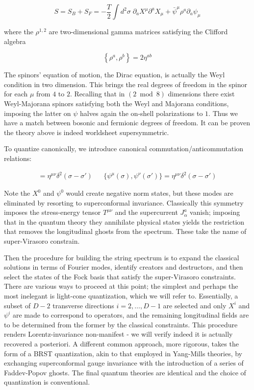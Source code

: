 \begin{equation}
S = S_B + S_F = -\frac{T}{2} \int d^2\sigma \; \partial_a X^\mu \partial^a X_\mu + \bar \psi^\mu \rho^a \partial_a \psi_\mu
\end{equation}

where the $\rho^{1,2}$ are two-dimensional gamma matrices satisfying the Clifford algebra

\begin{equation}
	\left\{ \rho^a,\rho^b \right\} = 2\eta^{ab}
	\label{}
\end{equation}

The spinors' equation of motion, the Dirac equation, is actually the Weyl condition in two dimension. This brings the real degrees of freedom in the spinor for each $\mu$ from $4$ to $2$. Recalling that in $(2\bmod 8)$ dimensions there exist Weyl-Majorana spinors satisfying both the Weyl and Majorana conditions, imposing the latter on $\psi$ halves again the on-shell polarizations to $1$. Thus we have a match between bosonic and fermionic degrees of freedom. It can be proven the theory above is indeed worldsheet supersymmetric.

To quantize canonically, we introduce canonical commutation/anticommutation relations:

\begin{align}
[X^\mu(\sigma),X^\nu(\sigma')] = \eta^{\mu\nu} \delta^2(\sigma-\sigma') && \{\psi^\mu(\sigma),\psi^\nu(\sigma')\} = \eta^{\mu\nu} \delta^2(\sigma-\sigma')
\end{align}

Note the $X^0$ and $\psi^0$ would create negative norm states, but these modes are eliminated by resorting to superconformal invariance. Classically this symmetry imposes the stress-energy tensor $T^{\mu\nu}$ and the supercurrent $J^a_\alpha$ vanish; imposing that in the quantum theory they annihilate physical states yields the restriction that removes the longitudinal ghosts from the spectrum. These take the name of super-Virasoro constrain.

Then the procedure for building the string spectrum is to expand the classical solutions in terms of Fourier modes, identify creators and destructors, and then select the states of the Fock basis that satisfy the super-Virasoro constraints. There are various ways to proceed at this point; the simplest and perhaps the most inelegant is light-cone quantization, which we will refer to. Essentially, a subset of $D-2$ transverse directions $i=2,\ldots,D-1$ are selected and only $X^i$ and $\psi^i$ are made to correspond to operators, and the remaining longitudinal fields are to be determined from the former by the classical constraints. This procedure renders Lorentz-invariance non-manifest - we will verify indeed it is actually recovered a posteriori. A different common approach, more rigorous, takes the form of a BRST quantization, akin to that employed in Yang-Mills theories, by exchanging superconformal gauge invariance with the introduction of a series of Faddev-Popov ghosts. The final quantum theories are identical and the choice of quantization is conventional.

